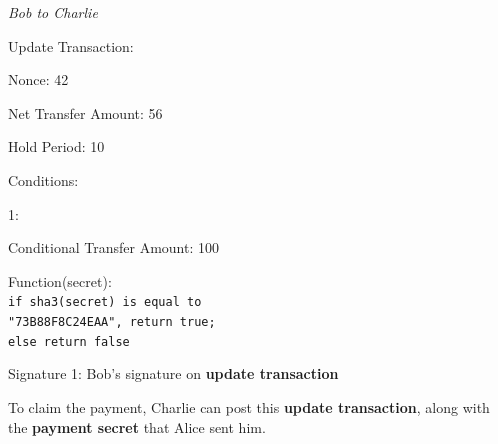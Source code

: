 \documentclass[a4paper]{article}
\newcommand{\bgls}[1]{\textbf{\gls{#1}}}
\newenvironment{mydescription}
{\begin{description}
  \setlength{\itemsep}{5pt}
    \setlength{\parskip}{0pt}
    \setlength{\labelsep}{5pt}
}{
\end{description}}
\begin{document}
\begin{mdframed}[style=message]{\emph{Bob to Charlie}}
\begin{mydescription}
  \item[Update Transaction:] \hfill
  \begin{mydescription}
    \item[Nonce:] 42
    \item[Net Transfer Amount:] 56
    \item[Hold Period:] 10
    \item[Conditions:] \hfill
    \begin{mydescription}
      \item[1:] \hfill
      \begin{mydescription}
        \item[Conditional Transfer Amount:] 100
        \item[Function(secret):] \texttt{\\ if sha3(secret) is equal to\\ "73B88F8C24EAA", return true;\\ else return false}
      \end{mydescription}
    \end{mydescription}
  \end{mydescription}
  \item[Signature 1:] Bob's signature on \bgls{update transaction}
\end{mydescription}
\end{mdframed}

To claim the payment, Charlie can post this \bgls{update transaction}, along with the \bgls{payment secret} that Alice sent him.
\end{document}
